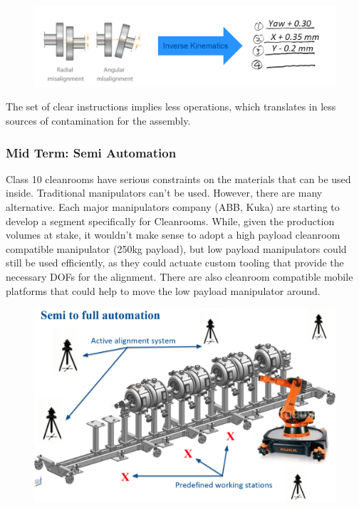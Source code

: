 \documentclass[12pt,a4paper]{article}
\begin{document}
\begin{figure}[h!]
\centering
\includegraphics[width=\textwidth]{9.png}
\end{figure}
The set of clear instructions implies less operations, which translates in less sources of contamination for the assembly.



\newpage

\subsubsection{Mid Term: Semi Automation}
Class 10 cleanrooms have serious constraints on the materials that can be used inside. Traditional manipulators can't be used. However, there are many alternative. Each major manipulators company (ABB, Kuka) are starting to develop a segment specifically for Cleanrooms. While, given the production volumes at stake, it wouldn't make sense to adopt a high payload cleanroom compatible manipulator (250kg payload), but low payload manipulators could still be used efficiently, as they could actuate custom tooling that provide the necessary DOFs for the alignment. There are also cleanroom compatible mobile platforms that could help to move the low payload manipulator around. 

\begin{figure}[h!]
\centering
\includegraphics[width=\textwidth]{31.png}
\end{figure}
\end{document}
